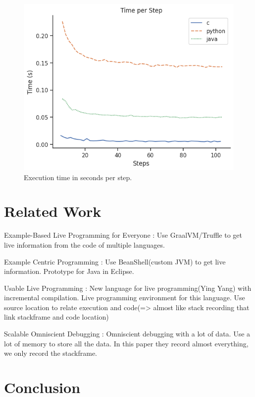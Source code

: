 \documentclass[english,submission]{programming}
\begin{document}
\begin{figure}[h]
  \centering
  \includegraphics[width=0.8\linewidth]{img/execute_ps.png}
  \caption{Execution time in seconds per step.}
  \label{fig:execute_tps}
\end{figure}

\section{Related Work}
\label{sec:related-work}

Example-Based Live Programming for Everyone\cite{10.1145/3426428.3426919} : Use GraalVM/Truffle to get live information from the code of multiple languages.

Example Centric Programming\cite{10.1145/1052883.1052894} : Use BeanShell(custom JVM) to get live information. Prototype for Java in Eclipse.

Usable Live Programming\cite{10.1145/2509578.2509585} : New language for live programming(Ying Yang) with incremental compilation. Live programming environment for this language.
Use source location to relate execution and code(=> almost like stack recording that link stackframe and code location)

Scalable Omniscient Debugging\cite{10.1145/1297105.1297067} : Omniscient debugging with a lot of data. Use a lot of memory to store all the data.
In this paper they record almost everything, we only record the stackframe.

\section{Conclusion}
\label{sec:conclusion}

\printbibliography
\end{document}
